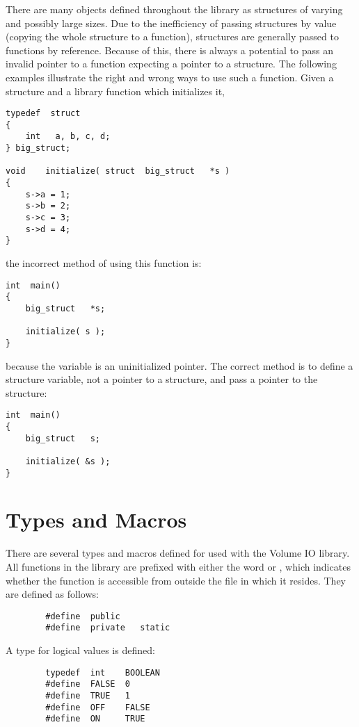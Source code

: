There are many objects defined throughout the library as structures of
varying and possibly large sizes.  Due to the inefficiency of passing
structures by value (copying the whole structure to a function),
structures are generally passed to functions by reference.  Because of
this, there is always a potential to pass an invalid pointer to a
function expecting a pointer to a structure.  The following examples
illustrate the right and wrong ways to use such a function.  Given a
structure and a library function which initializes it,
\begin{verbatim}
typedef  struct
{
    int   a, b, c, d;
} big_struct;

void    initialize( struct  big_struct   *s )
{
    s->a = 1;
    s->b = 2;
    s->c = 3;
    s->d = 4;
}
\end{verbatim}
the incorrect method of using this function is:
\begin{verbatim}
int  main()
{
    big_struct   *s;

    initialize( s );
}
\end{verbatim}
because the variable  is an uninitialized pointer.  The
correct method is to define a structure variable, not a pointer to a
structure, and pass a pointer to the structure:
\begin{verbatim}
int  main()
{
    big_struct   s;

    initialize( &s );
}
\end{verbatim}

\chapter{Types and Macros}

There are several types and macros defined for used with the Volume IO
library.  All functions in the library are prefixed with either the
word  or , which indicates whether the
function is accessible from outside the file in which it resides.
They are defined as follows:
{\bf\begin{verbatim}
        #define  public
        #define  private   static
\end{verbatim}}

A type for logical values is defined:
{\bf\begin{verbatim}
        typedef  int    BOOLEAN
        #define  FALSE  0
        #define  TRUE   1
        #define  OFF    FALSE
        #define  ON     TRUE
\end{verbatim}}

